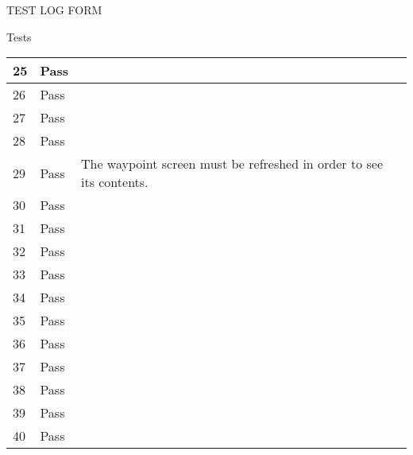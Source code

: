 \documentclass{article}
\begin{document}
\begin{section}{TEST LOG FORM}
\begin{subsection}{Tests}
\begin{tabularx}{\linewidth}{| p{1.5cm} | p{2cm} | p{9cm} | X |}
25
&
Pass
&

&

\\
\hline

26
&
Pass
&

&

\\
\hline

27
&
Pass
&

&

\\
\hline

28
&
Pass
&

&

\\
\hline

29
&
Pass
&
The waypoint screen must be refreshed in order to see its contents.
&

\\
\hline

30
&
Pass
&

&

\\
\hline

31
&
Pass
&

&

\\
\hline

32
&
Pass
&

&

\\
\hline

33
&
Pass
&

&

\\
\hline

34
&
Pass
&

&

\\
\hline

35
&
Pass
&

&

\\
\hline

36
&
Pass
&

&

\\
\hline

37
&
Pass
&

&

\\
\hline

38
&
Pass
&

&

\\
\hline

39
&
Pass
&

&

\\
\hline

40
&
Pass
&

&

\\
\hline

			\end{tabularx}
		\end{subsection}
	\end{section}
	
\end{document}
